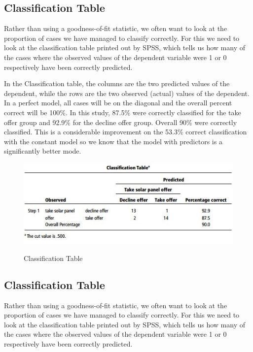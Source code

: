 \documentclass[a4paper,12pt]{article}
\begin{document}
\subsection{Classification Table}
Rather than using a goodness-of-fit statistic, we often want to look at the proportion of cases we have managed to classify correctly. For this we need to look at the classification table printed out by SPSS, which tells us how many of the cases where the observed values of the dependent variable were 1 or 0 respectively have
been correctly predicted.

In the Classification table, the columns are the two predicted values of the dependent, while the rows are the two observed (actual) values of the dependent. In a perfect model, all cases will be on the diagonal and the
overall percent correct will be 100\%. In this study, 87.5\% were correctly classified for the take offer group and 92.9\% for the decline offer group. Overall 90\% were correctly classified. This is a considerable improvement on the 53.3\% correct classification with the constant model so we know that the model with predictors is a significantly better mode.
\begin{figure}[h!]
	\begin{center}
		\includegraphics[scale=0.6]{images/Logistic7}\\
		\caption{Classification Table}
	\end{center}
\end{figure}
\subsection{Classification Table}
Rather than using a goodness-of-fit statistic, we often want to look at the proportion of cases we have managed to classify correctly. For this we need to look at the classification table printed out by SPSS, which tells us how many of the cases where the observed values of the dependent variable were 1 or 0 respectively have
been correctly predicted.
\end{document}
